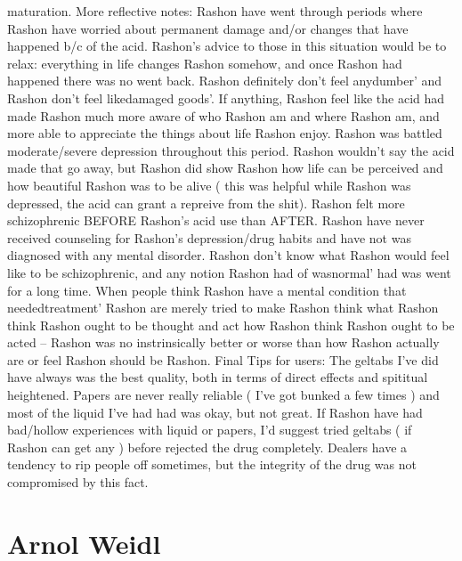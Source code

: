 \documentclass[12pt]{book}
\begin{document}
maturation. More reflective notes: Rashon have went through periods where Rashon have worried about permanent damage and/or changes that have happened b/c of the acid. Rashon's advice to those in this situation would be to relax: everything in life changes Rashon somehow, and once Rashon had happened there was no went back. Rashon definitely don't feel anydumber' and Rashon don't feel likedamaged goods'. If anything, Rashon feel like the acid had made Rashon much more aware of who Rashon am and where Rashon am, and more able to appreciate the things about life Rashon enjoy. Rashon was battled moderate/severe depression throughout this period. Rashon wouldn't say the acid made that go away, but Rashon did show Rashon how life can be perceived and how beautiful Rashon was to be alive ( this was helpful while Rashon was depressed, the acid can grant a repreive from the shit). Rashon felt more schizophrenic BEFORE Rashon's acid use than AFTER. Rashon have never received counseling for Rashon's depression/drug habits and have not was diagnosed with any mental disorder. Rashon don't know what Rashon would feel like to be schizophrenic, and any notion Rashon had of wasnormal' had was went for a long time. When people think Rashon have a mental condition that neededtreatment' Rashon are merely tried to make Rashon think what Rashon think Rashon ought to be thought and act how Rashon think Rashon ought to be acted -- Rashon was no instrinsically better or worse than how Rashon actually are or feel Rashon should be Rashon. Final Tips for users: The geltabs I've did have always was the best quality, both in terms of direct effects and spititual heightened. Papers are never really reliable ( I've got bunked a few times ) and most of the liquid I've had had was okay, but not great. If Rashon have had bad/hollow experiences with liquid or papers, I'd suggest tried geltabs ( if Rashon can get any ) before rejected the drug completely. Dealers have a tendency to rip people off sometimes, but the integrity of the drug was not compromised by this fact.



\chapter{Arnol Weidl}
\end{document}

